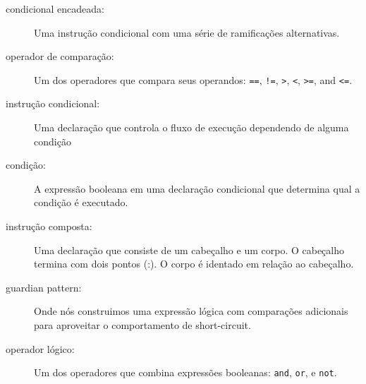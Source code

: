 {\begin{description}
\item[condicional encadeada:]  Uma instrução condicional com uma série 
de ramificações alternativas.

\item[operador de comparação:] Um dos operadores que compara 
seus operandos: {\tt ==}, {\tt !=}, {\tt >}, {\tt <}, {\tt >=}, and {\tt <=}.

\item[instrução condicional:] Uma declaração que controla o fluxo de 
execução dependendo de alguma condição

\item[condição:] A expressão booleana em uma declaração condicional 
que determina qual a condição é executado.

\item[instrução composta:] Uma declaração que consiste de um cabeçalho 
e um corpo. O cabeçalho termina com dois pontos (:). O corpo é identado em 
relação ao cabeçalho.

\item[guardian pattern:] Onde nós construimos uma expressão lógica com 
comparações adicionais para aproveitar o comportamento de short-circuit.

\item[operador lógico:] Um dos operadores que combina expressões 
booleanas: {\tt and}, {\tt or}, e {\tt not}.


\end{description}}

